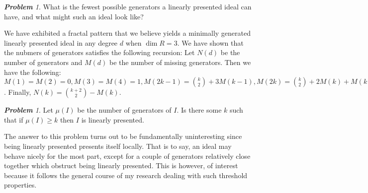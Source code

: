 \documentclass[letter,12pt]{article}
\theoremstyle{definition}
\theoremstyle{remark}
\newtheorem{prob}[thm]{\bf Problem}
\numberwithin{equation}{section}
\begin{document}
\begin{prob}
	What is the fewest possible generators a linearly presented ideal can have, and what might such an ideal look like?
\end{prob}

We have exhibited a fractal pattern that we believe yields a minimally generated linearly presented ideal in any degree $d$ when $\dim R = 3$. We have shown that the nubmers of generators satisfies the following recursion: Let $N(d)$ be the number of generators and $M(d)$ be the number of missing generators. Then we have the following: $M(1) = M(2) = 0, M(3) = M(4) = 1, M(2k-1) = \binom{k}{2} + 3M(k-1), M(2k)   = \binom{k}{2} + 2M(k) + M(k-1) $. Finally, $N(k) = \binom{k+2}{2} - M(k)$. 
        
\begin{prob}
	Let $\mu(I)$ be the number of generators of $I$. Is there some $k$ such that if $\mu(I) \geq k$ then $I$ is linearly presented. 
\end{prob}

The answer to this problem turns out to be fundamentally uninteresting since being linearly presented presents itself locally. That is to say, an ideal may behave nicely for the most part, except for a couple of generators relatively close together which obstruct being linearly presented. This is however, of interest because it follows the general course of my research dealing with such threshold properties. 
\end{document}
